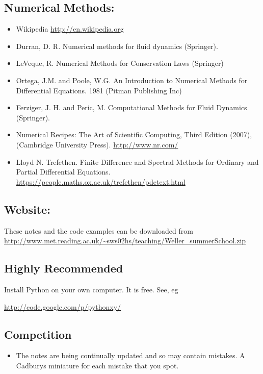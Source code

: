 \subsection*{Numerical Methods: }
\begin{itemize}
\item Wikipedia \url{http://en.wikipedia.org} 
\item Durran, D. R. Numerical methods for fluid dynamics (Springer). 
\item LeVeque, R. Numerical Methods for Conservation Laws (Springer)
\item Ortega, J.M. and Poole, W.G. An Introduction to Numerical Methods
for Differential Equations. 1981 (Pitman Publishing Inc)
\item Ferziger, J. H. and Peric, M. Computational Methods for Fluid Dynamics
(Springer). 
\item Numerical Recipes: The Art of Scientific Computing, Third Edition
(2007), (Cambridge University Press). \url{http://www.nr.com/} 
\item Lloyd N. Trefethen. Finite Difference and Spectral Methods for Ordinary
and Partial Differential Equations. \url{https://people.maths.ox.ac.uk/trefethen/pdetext.html}
\end{itemize}

\subsection*{Website:}

These notes and the code examples can be downloaded from\\
 \url{http://www.met.reading.ac.uk/~sws02hs/teaching/Weller_summerSchool.zip}


\subsection*{Highly Recommended}

{\color{red} Install Python on your own computer. It is free. See,
eg

\url{http://code.google.com/p/pythonxy/} }


\subsection*{Competition}
\begin{itemize}
\item The notes are being continually updated and so may contain mistakes.
A Cadburys miniature for each mistake that you spot.\end{itemize}

